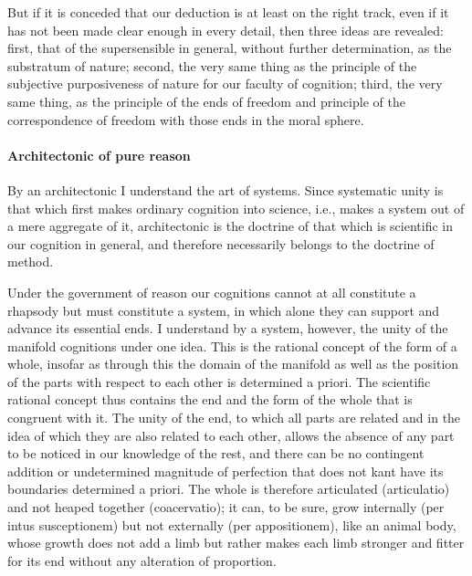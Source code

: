 \documentclass{article}
\begin{document}
But if it is conceded that our deduction is at least on the right track,
even if it has not been made clear enough in every detail,
then three ideas are revealed:
first, that of the supersensible in general,
without further determination, as the substratum of nature;
second, the very same thing as the principle of the subjective 
purposiveness of nature for our faculty of cognition;
third, the very same thing, as the principle of the ends of freedom
and principle of the correspondence of freedom with those ends in the moral sphere.

\paragraph{Architectonic of pure reason}

By an architectonic I understand the art of systems.
Since systematic unity is that which first makes ordinary cognition into science, i.e.,
makes a system out of a mere aggregate of it,
architectonic is the doctrine of that which is
scientific in our cognition in general,
and therefore necessarily belongs to the doctrine of method.

Under the government of reason our cognitions cannot at all
constitute a rhapsody but must constitute a system,
in which alone they can support and advance its essential ends.
I understand by a system, however,
the unity of the manifold cognitions under one idea.
This is the rational concept of the form of a whole,
insofar as through this the domain of the manifold
as well as the position of the parts with respect to
each other is determined a priori.
The scientific rational concept thus contains 
the end and the form of the whole that is congruent with it.
The unity of the end, to which all parts are related
and in the idea of which they are also related to each other,
allows the absence of any part to be noticed
in our knowledge of the rest,
and there can be no contingent addition
or undetermined magnitude of perfection 
that does not kant have its boundaries determined a priori.
The whole is therefore articulated (articulatio)
and not heaped together (coacervatio);
it can, to be sure, grow internally (per intus susceptionem)
but not externally (per appositionem),
like an animal body, whose growth does not add a limb
but rather makes each limb stronger and fitter
for its end without any alteration of proportion.
\end{document}

